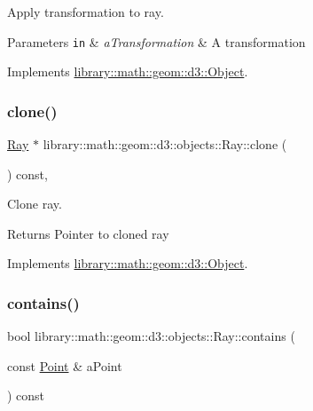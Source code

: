 Apply transformation to ray. 


\begin{DoxyParams}[1]{Parameters}
\mbox{\tt in}  & {\em a\+Transformation} & A transformation \\
\hline
\end{DoxyParams}


Implements \hyperlink{classlibrary_1_1math_1_1geom_1_1d3_1_1_object_a5fc47b1ee5d9a28efc6010d3d1512470}{library\+::math\+::geom\+::d3\+::\+Object}.

\mbox{\label{classlibrary_1_1math_1_1geom_1_1d3_1_1objects_1_1_ray_a247ea36c39c3b44d003b157689850ae4}} 
\subsubsection{\texorpdfstring{clone()}{clone()}}
{\footnotesize\ttfamily \hyperlink{classlibrary_1_1math_1_1geom_1_1d3_1_1objects_1_1_ray}{Ray} $\ast$ library\+::math\+::geom\+::d3\+::objects\+::\+Ray\+::clone (\begin{DoxyParamCaption}{ }\end{DoxyParamCaption}) const\hspace{0.3cm}{\ttfamily [override]}, {\ttfamily [virtual]}}



Clone ray. 

\begin{DoxyReturn}{Returns}
Pointer to cloned ray 
\end{DoxyReturn}


Implements \hyperlink{classlibrary_1_1math_1_1geom_1_1d3_1_1_object_a1a784c6b359e0eb97cd34fabc42f2f3f}{library\+::math\+::geom\+::d3\+::\+Object}.

\mbox{\label{classlibrary_1_1math_1_1geom_1_1d3_1_1objects_1_1_ray_a6179dc1453ac7a54b13fe6bf46c0a66b}} 
\subsubsection{\texorpdfstring{contains()}{contains()}\hspace{0.1cm}{\footnotesize\ttfamily [1/2]}}
{\footnotesize\ttfamily bool library\+::math\+::geom\+::d3\+::objects\+::\+Ray\+::contains (\begin{DoxyParamCaption}\item[{const \hyperlink{classlibrary_1_1math_1_1geom_1_1d3_1_1objects_1_1_point}{Point} \&}]{a\+Point }\end{DoxyParamCaption}) const}



